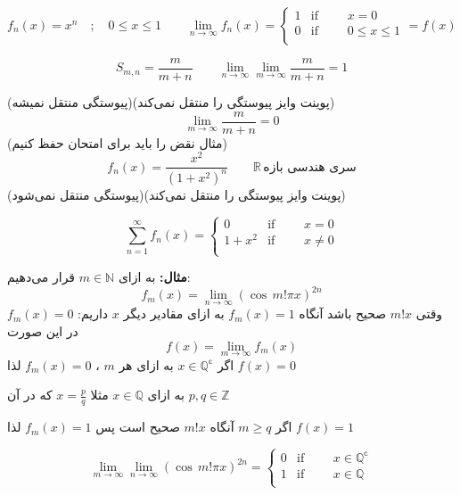 \documentclass[12pt]{report}
\begin{document}
	\begin{equation*}
	f_n(x) = x^n \quad ; \quad 0\leq x \leq 1 \qquad \lim_{n \to \infty} f_n(x)=
	\begin{cases}
		1 & \text{if }\qquad x = 0 \\
		0 & \text{if }\qquad 0\leq x \leq 1   \\
		
	\end{cases}
	= f(x)
	\end{equation*}

\[
S_{m , n} = \frac{m}{m+n} \qquad \lim_{n \to \infty} \lim_{m \to \infty} \frac{m}{m+n} = 1
\]

(پیوستگی منتقل نمیشه)(پوینت وایز پیوستگی را منتقل نمی‌کند)
\[
\lim_{m \to \infty} \frac{m}{m+n} = 0
\]
(مثال نقض را باید برای امتحان حفظ کنیم)
\[
f_n(x) = \frac{x^2}{(1+x^2)^n} \qquad \mathbb{R} \, \text{سری هندسی بازه}  
\]
(پیوستگی منتقل نمی‌شود)(پوینت وایز پیوستگی را منتقل نمی‌کند)

\begin{equation*}
\sum_{n = 1}^{\infty} f_n(x)=
\begin{cases}
	0 & \text{if }\qquad x = 0 \\
	1 + x^2 & \text{if }\qquad x \neq 0 \\
	
\end{cases}
\end{equation*}	

\textbf{مثال:}
به ازای 
$m \in \mathbb{N}$
قرار می‌دهیم:
\[
f_m(x) = \lim_{n \to \infty} (\cos\, m! \pi x)^{2n} 
\]
وقتی
$m!x$
صحیح باشد  آنگاه
$f_m(x) = 1$
به ازای مقادیر دیگر 
$x$
داریم: 
$f_m(x) = 0$
در این صورت 
\[
f(x) = \lim_{m \to \infty} f_m(x)
\]
اگر 
$x \in \mathbb{Q^c}$
به ازای هر 
$m$
،
$f_m(x) = 0$
لذا
$f(x) = 0$

به ازای 
$x \in \mathbb{Q}$
مثلا
$x = \frac{p}{q}$
که در آن 
$ p , q \in \mathbb{Z} \quad$

اگر 
$m \geq q$
آنگاه 
$m!x$
صحیح است پس 
$f_m(x) = 1$
لذا
$f(x) = 1$

\begin{equation*}
	 \lim_{m \to \infty}\lim_{n \to \infty} (\cos\, m! \pi x)^{2n} =
	\begin{cases}
		0 & \text{if }\qquad x \in \mathbb{Q^c} \\
		1 & \text{if }\qquad  x \in \mathbb{Q}\\
		
	\end{cases}
\end{equation*}
\end{document}
